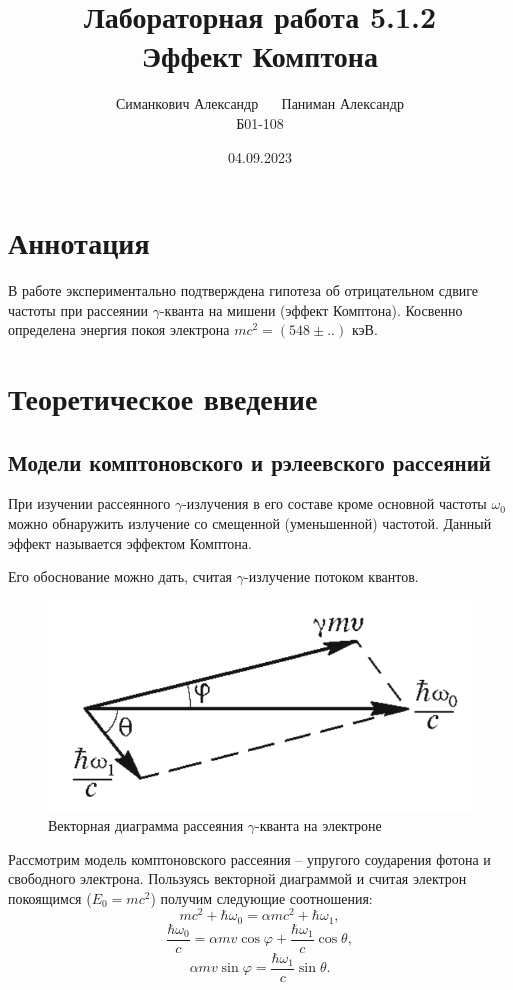 \documentclass[12pt,a4paper]{article}
\title{Лабораторная работа 5.1.2 \\ Эффект Комптона}
\author{Симанкович Александр $\quad$ Паниман Александр\\ Б01-108}
\date{04.09.2023}
\begin{document}
	\maketitle
	
	\section*{Аннотация}
	
	В работе экспериментально подтверждена гипотеза об отрицательном сдвиге частоты при рассеянии $\gamma$-кванта на мишени (эффект Комптона). Косвенно определена энергия покоя электрона $mc^2 = (548 \pm ..)$ кэВ.
			
	\section*{Теоретическое введение}
	
	\subsection*{Модели комптоновского и рэлеевского рассеяний}
	При изучении рассеянного $\gamma$-излучения в его составе кроме основной частоты $\omega_0$ можно обнаружить излучение со смещенной ($\textit{уменьшенной}$) частотой. Данный эффект называется эффектом Комптона.
	
	Его обоснование можно дать, считая $\gamma$-излучение потоком квантов.

	\begin{figure}[h]
		\includegraphics[scale=0.65]{res/impulse_diagram.png}
		\caption{Векторная диаграмма рассеяния $\gamma$-кванта на электроне}
		\label{fig:impulse_diagram}
	\end{figure}
	
	Рассмотрим модель комптоновского рассеяния -- упругого соударения фотона и свободного электрона. Пользуясь векторной диаграммой и считая электрон покоящимся ($E_0 = mc^2$) получим следующие соотношения:
	$$ mc^2  + \hbar \omega_0 = \alpha m c^2 + \hbar \omega_1, $$
	$$ \frac{\hbar \omega_0}{c} = \alpha m v \cos \varphi + \frac{\hbar \omega_1}{c} \cos \theta, $$
	$$ \alpha m v \sin \varphi = \frac{\hbar \omega_1}{c} \sin \theta.$$
	
\end{document}
